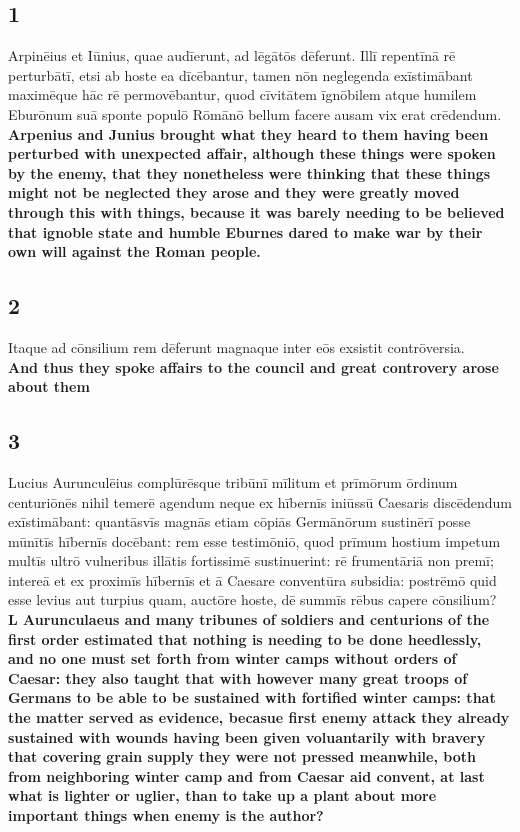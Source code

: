 \documentclass{article}
\begin{document}
\subsection*{1}
Arpinēius et Iūnius, quae audīerunt, ad lēgātōs dēferunt. Illī repentīnā rē perturbātī, etsi ab hoste ea dīcēbantur, tamen nōn neglegenda exīstimābant maximēque hāc rē permovēbantur, quod cīvitātem īgnōbilem atque humilem Eburōnum suā sponte populō Rōmānō bellum facere ausam vix erat crēdendum. \\
\textbf{Arpenius and Junius brought what they heard to them having been perturbed with unexpected affair, although these things were spoken by the enemy, that they nonetheless were thinking that these things might not be neglected they arose and they were greatly moved through this with things, because it was barely needing to be believed that ignoble state and humble Eburnes dared to make war by their own will against the Roman people.}

\subsection*{2}
Itaque ad cōnsilium rem dēferunt magnaque inter eōs exsistit contrōversia. \\
\textbf{And thus they spoke affairs to the council and great controvery arose about them}

\subsection*{3}
Lucius Aurunculēius complūrēsque tribūnī mīlitum et prīmōrum ōrdinum centuriōnēs nihil temerē agendum neque ex hībernīs iniūssū Caesaris discēdendum exīstimābant: quantāsvīs magnās etiam cōpiās Germānōrum sustinērī posse mūnītīs hībernīs docēbant: rem esse testimōniō, quod prīmum hostium impetum multīs ultrō vulneribus illātis fortissimē sustinuerint: rē frumentāriā non premī; intereā et ex proximīs hībernīs et ā Caesare conventūra subsidia: postrēmō quid esse levius aut turpius quam, auctōre hoste, dē summīs rēbus capere cōnsilium?\\
\textbf{L Aurunculaeus and many tribunes of soldiers and centurions of the first order estimated that nothing is needing to be done heedlessly, and no one must set forth from winter camps without orders of Caesar: they also taught that with however many great troops of Germans to be able to be sustained with fortified winter camps: that the matter served as evidence, becasue first enemy attack they already sustained with wounds having been given voluantarily with bravery that covering grain supply they were not pressed meanwhile, both from neighboring winter camp and from Caesar aid  convent, at last what is lighter or uglier, than to take up a plant about more important things when enemy is the author?}
\end{document}
